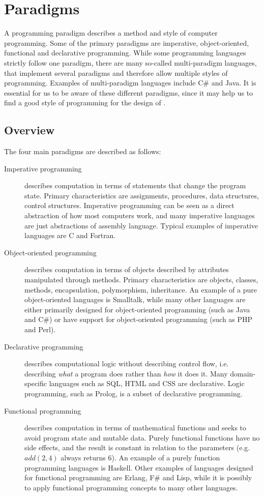 \section{Paradigms}
\label{sec:paradigms}

A programming paradigm describes a method and style of computer programming.
Some of the primary paradigms are imperative, object-oriented, functional and declarative programming. While some programming languages strictly follow one paradigm, there are many so-called multi-paradigm languages, that implement several paradigms and therefore allow multiple styles of programming. Examples of multi-paradigm languages include C\# and Java. It is essential for us to be aware of these different paradigms, since it may help us to find a good style of programming for the design of \productname{}.

\subsection{Overview}
The four main paradigms are described as follows:
\begin{description}
\item[Imperative programming] describes computation in terms of statements that change the program state. Primary characteristics are assignments, procedures, data structures, control structures. Imperative programming can be seen as a direct abstraction of how most computers work, and many imperative languages are just abstractions of assembly language. Typical examples of imperative languages are C and Fortran.
\item[Object-oriented programming] describes computation in terms of objects described by attributes manipulated through methods. Primary characteristics are objects, classes, methods, encapsulation, polymorphism, inheritance. An example of a pure object-oriented languages is Smalltalk, while many other languages are either primarily designed for object-oriented programming (such as Java and C\#) or have support for object-oriented programming (such as PHP and Perl).
\item[Declarative programming] describes computational logic without describing control flow, i.e. describing {\em what} a program does rather than {\em how} it does it. Many domain-specific languages such as SQL, HTML and CSS are declarative. Logic programming, such as Prolog, is a subset of declarative programming.
\item[Functional programming] describes computation in terms of mathematical functions and seeks to avoid program state and mutable data. Purely functional functions have no side effects, and the result is constant in relation to the parameters (e.g. $add(2, 4)$ always returns $6$). An example of a purely function programming languages is Haskell. Other examples of languages designed for functional programming are Erlang, F\# and Lisp, while it is possibly to apply functional programming concepts to many other languages.
\end{description}

